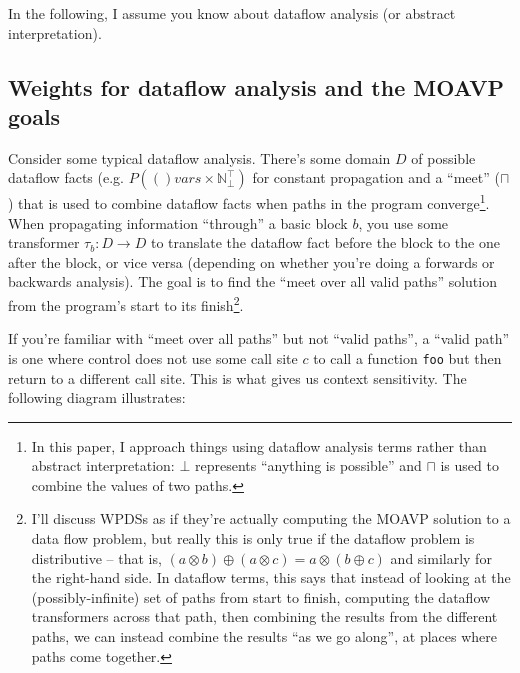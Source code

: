 \documentclass{article}
\newcommand{\Code}[1]{\texttt{#1}}
\newcommand{\powerset}[1]{P(#1)}
\newcommand{\bbN}{\mathbb{N}}
\newcommand{\meet}{\sqcap}
\newcommand{\extend}{\otimes}
\newcommand{\combine}{\oplus}
\begin{document}

In the following, I assume you know about dataflow analysis (or
abstract interpretation).

\subsection{Weights for dataflow analysis and the MOAVP goals}

Consider some typical dataflow analysis. There's some domain $D$ of
possible dataflow facts (e.g. $\powerset(vars \times \bbN_\bot^\top)$
for constant propagation and a ``meet'' ($\meet$) that is used to
combine dataflow facts when paths in the program converge\footnote{In
  this paper, I approach things using dataflow analysis terms
  rather than abstract interpretation: $\bot$ represents ``anything is
  possible'' and $\meet$ is used to combine the values of two paths.}.
When propagating information ``through'' a basic block $b$, you use
some transformer $\tau_b: D \rightarrow D$ to translate the dataflow
fact before the block to the one after the block, or vice versa
(depending on whether you're doing a forwards or backwards
analysis). The goal is to find the ``meet over all valid paths''
solution from the program's start to its finish\footnote{I'll discuss
  WPDSs as if they're actually computing the MOAVP solution to a data
  flow problem, but really this is only true if the dataflow problem
  is distributive -- that is, $(a \extend b) \combine (a \extend c) =
  a \extend (b \combine c)$ and similarly for the right-hand side. In
  dataflow terms, this says that instead of looking at the
  (possibly-infinite) set of paths from start to finish, computing the
  dataflow transformers across that path, then combining the results
  from the different paths, we can instead combine the results ``as we
  go along'', at places where paths come together.}.

If you're familiar with ``meet over all paths'' but not ``valid
paths'', a ``valid path'' is one where control does not use some call
site $c$ to call a function \Code{foo} but then return to a different
call site. This is what gives us context sensitivity. The following
diagram illustrates:
\end{document}

